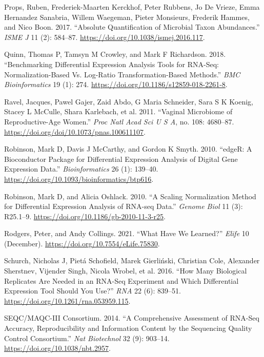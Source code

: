 \documentclass[
]{article}
\newlength{\cslhangindent}
\newlength{\cslentryspacingunit} %
\newenvironment{CSLReferences}[2] %
 {%
  \setlength{\parindent}{0pt}
  \ifodd #1
  \let\oldpar\par
  \def\par{\hangindent=\cslhangindent\oldpar}
  \fi
  \setlength{\parskip}{#2\cslentryspacingunit}
 }%
 {}
\begin{document}
\begin{CSLReferences}{1}{0}
\leavevmode{}%
Props, Ruben, Frederiek-Maarten Kerckhof, Peter Rubbens, Jo De Vrieze,
Emma Hernandez Sanabria, Willem Waegeman, Pieter Monsieurs, Frederik
Hammes, and Nico Boon. 2017. {``Absolute Quantification of Microbial
Taxon Abundances.''} \emph{ISME J} 11 (2): 584--87.
\url{https://doi.org/10.1038/ismej.2016.117}.

\leavevmode{}%
Quinn, Thomas P, Tamsyn M Crowley, and Mark F Richardson. 2018.
{``Benchmarking Differential Expression Analysis Tools for RNA-Seq:
Normalization-Based Vs. Log-Ratio Transformation-Based Methods.''}
\emph{BMC Bioinformatics} 19 (1): 274.
\url{https://doi.org/10.1186/s12859-018-2261-8}.

\leavevmode{}%
Ravel, Jacques, Pawel Gajer, Zaid Abdo, G Maria Schneider, Sara S K
Koenig, Stacey L McCulle, Shara Karlebach, et al. 2011. {``Vaginal
Microbiome of Reproductive-Age Women.''} \emph{Proc Natl Acad Sci U S
A}, no. 108: 4680--87. \url{https://doi.org/doi/10.1073/pnas.100611107}.

\leavevmode{}%
Robinson, Mark D, Davis J McCarthy, and Gordon K Smyth. 2010. {``edgeR:
A Bioconductor Package for Differential Expression Analysis of Digital
Gene Expression Data.''} \emph{Bioinformatics} 26 (1): 139--40.
\url{https://doi.org/10.1093/bioinformatics/btp616}.

\leavevmode{}%
Robinson, Mark D, and Alicia Oshlack. 2010. {``A Scaling Normalization
Method for Differential Expression Analysis of {RNA-seq} Data.''}
\emph{Genome Biol} 11 (3): R25.1--9.
\url{https://doi.org/10.1186/gb-2010-11-3-r25}.

\leavevmode{}%
Rodgers, Peter, and Andy Collings. 2021. {``What Have We Learned?''}
\emph{Elife} 10 (December). \url{https://doi.org/10.7554/eLife.75830}.

\leavevmode{}%
Schurch, Nicholas J, Pietá Schofield, Marek Gierliński, Christian Cole,
Alexander Sherstnev, Vijender Singh, Nicola Wrobel, et al. 2016. {``How
Many Biological Replicates Are Needed in an RNA-Seq Experiment and Which
Differential Expression Tool Should You Use?''} \emph{RNA} 22 (6):
839--51. \url{https://doi.org/10.1261/rna.053959.115}.

\leavevmode{}%
SEQC/MAQC-III Consortium. 2014. {``A Comprehensive Assessment of RNA-Seq
Accuracy, Reproducibility and Information Content by the Sequencing
Quality Control Consortium.''} \emph{Nat Biotechnol} 32 (9): 903--14.
\url{https://doi.org/10.1038/nbt.2957}.


\end{CSLReferences}
\end{document}

